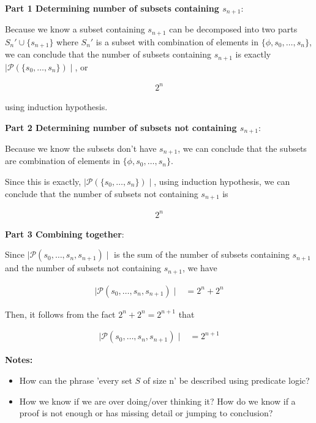 \documentclass[12pt]{article}
\begin{document}
\begin{enumerate}[a.]
    \bigskip

    \textbf{Part 1 Determining number of subsets containing $s_{n+1}$}:

    Because we know a subset containing $s_{n+1}$ can be decomposed into two parts
    $S_n' \cup \{s_{n+1}\}$ where $S_n'$ is a subset with combination of elements in
    $\{\phi, s_0,\dots,s_n\}$, we can conclude that the number of subsets containing
    $s_{n+1}$ is exactly $\mid \mathcal{P}(\{s_0,\dots,s_n\}) \mid$, or

    \begin{align}
        2^n
    \end{align}

    using induction hypothesis.

    \bigskip

    \textbf{Part 2 Determining number of subsets not containing $s_{n+1}$}:

    Because we know the subsets don't have $s_{n+1}$, we can conclude that
    the subsets are combination of elements in $\{\phi, s_0,\dots,s_n\}$.

    \bigskip

    Since this is exactly, $\mid \mathcal{P}(\{s_0,\dots,s_n\}) \mid$, using induction
    hypothesis, we can conclude that the number of subsets not containing $s_{n+1}$
    is

    \begin{align}
        2^n
    \end{align}

    \bigskip

    \textbf{Part 3 Combining together}:

    Since $\mid \mathcal{P}(s_0,\dots,s_n,s_{n+1}) \mid$ is the sum of the
    number of subsets containing $s_{n+1}$ and the number of subsets not containing
    $s_{n+1}$, we have

    \begin{align}
        \mid \mathcal{P}(s_0,\dots,s_n,s_{n+1}) \mid &= 2^n + 2^n
    \end{align}

    Then, it follows from the fact $2^n + 2^n = 2^{n+1}$ that

    \begin{align}
        \mid \mathcal{P}(s_0,\dots,s_n,s_{n+1}) \mid &= 2^{n+1}
    \end{align}

    \textbf{Notes:}
    \begin{itemize}
        \item How can the phrase 'every set $S$ of size n' be described using
        predicate logic?
        \item How we know if we are over doing/over thinking it? How do we know
        if a proof is not enough or has missing detail or jumping to conclusion?
    \end{itemize}

\end{enumerate}
\end{document}
